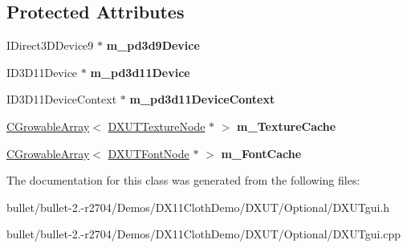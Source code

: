 \subsection*{Protected Attributes}
\begin{DoxyCompactItemize}
\item 
\hypertarget{class_c_d_x_u_t_dialog_resource_manager_a341c700529571a7084629e705cf32d1b}{I\+Direct3\+D\+Device9 $\ast$ {\bfseries m\+\_\+pd3d9\+Device}}\label{class_c_d_x_u_t_dialog_resource_manager_a341c700529571a7084629e705cf32d1b}

\item 
\hypertarget{class_c_d_x_u_t_dialog_resource_manager_a8eaa5c87800967cf076c7d7c21c32926}{I\+D3\+D11\+Device $\ast$ {\bfseries m\+\_\+pd3d11\+Device}}\label{class_c_d_x_u_t_dialog_resource_manager_a8eaa5c87800967cf076c7d7c21c32926}

\item 
\hypertarget{class_c_d_x_u_t_dialog_resource_manager_a37909706d39c9066626e12852583d49c}{I\+D3\+D11\+Device\+Context $\ast$ {\bfseries m\+\_\+pd3d11\+Device\+Context}}\label{class_c_d_x_u_t_dialog_resource_manager_a37909706d39c9066626e12852583d49c}

\item 
\hypertarget{class_c_d_x_u_t_dialog_resource_manager_a2956065bdfe2f32b8690336d3ef9d301}{\hyperlink{class_c_growable_array}{C\+Growable\+Array}$<$ \hyperlink{struct_d_x_u_t_texture_node}{D\+X\+U\+T\+Texture\+Node} $\ast$ $>$ {\bfseries m\+\_\+\+Texture\+Cache}}\label{class_c_d_x_u_t_dialog_resource_manager_a2956065bdfe2f32b8690336d3ef9d301}

\item 
\hypertarget{class_c_d_x_u_t_dialog_resource_manager_a56ab5b6df1347f17d404ef96f8d0ab2b}{\hyperlink{class_c_growable_array}{C\+Growable\+Array}$<$ \hyperlink{struct_d_x_u_t_font_node}{D\+X\+U\+T\+Font\+Node} $\ast$ $>$ {\bfseries m\+\_\+\+Font\+Cache}}\label{class_c_d_x_u_t_dialog_resource_manager_a56ab5b6df1347f17d404ef96f8d0ab2b}

\end{DoxyCompactItemize}


The documentation for this class was generated from the following files\+:\begin{DoxyCompactItemize}
\item 
bullet/bullet-\/2.-\/r2704/\+Demos/\+D\+X11\+Cloth\+Demo/\+D\+X\+U\+T/\+Optional/D\+X\+U\+Tgui.\+h\item 
bullet/bullet-\/2.-\/r2704/\+Demos/\+D\+X11\+Cloth\+Demo/\+D\+X\+U\+T/\+Optional/D\+X\+U\+Tgui.\+cpp\end{DoxyCompactItemize}
